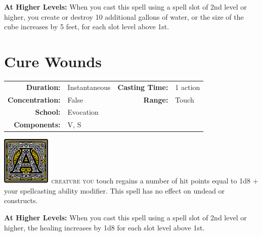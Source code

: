 \documentclass[12pt,showtrims]{memoir}
\begin{document}
\vspace{8pt} \noindent\textbf{At Higher Levels:} When you cast this spell using a spell slot of 2nd level or higher, you create or destroy 10 additional gallons of water, or the size of the cube increases by 5 feet, for each slot level above 1st.
\newpage
{}
\newpage


\section*{Cure Wounds}

{
\small\centering\vspace{-6pt}
\begin{tabular}{rlrl}
\toprule

\textbf{Duration:} & Instantaneous &
\textbf{Casting Time:} & 1 action \\
\textbf{Concentration:} & False &
\textbf{Range:} & Touch \\
\textbf{School:} & Evocation \\
\textbf{Components:} & \multicolumn{3}{p{0.7\textwidth}}{V, S}\\

\bottomrule
\end{tabular}
}

\vspace{1\baselineskip}\noindent
\lettrine[lines=4]{\includegraphics[height=66pt]{initials/A.png}}{\ creature you} touch regains a number of hit points equal to 1d8 + your spellcasting ability modifier. This spell has no effect on undead or constructs.

\vspace{8pt} \noindent\textbf{At Higher Levels:} 
When you cast this spell using a spell slot of 2nd level or higher, the healing increases by 1d8 for each slot level above 1st.

\newpage

\newpage
\end{document}
